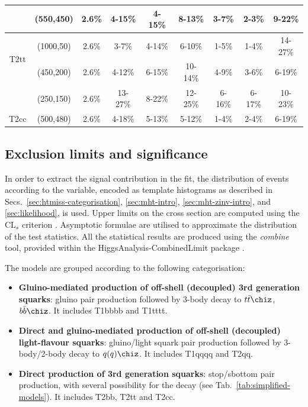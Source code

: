 \begin{table}[h!]
\begin{tabular}{ ccccccccc }
            & (550,450)  & 2.6\% & 4-15\% & 4-15\% & 8-13\% & 3-7\% & 2-3\% & 9-22\%  \\ 
        \hline
        \multirow{2}{*}{T2tt}
            & (1000,50) & 2.6\% & 3-7\%   & 4-14\% & 6-10\%  & 1-5\%  & 1-4\%  & 14-27\% \\
            & (450,200) & 2.6\% & 4-12\%  & 6-15\% & 10-14\% & 4-9\%  & 3-6\%  & 6-19\%  \\
            & (250,150) & 2.6\% & 13-27\% & 8-22\% & 12-25\% & 6-16\% & 6-17\% & 10-23\% \\
        \hline
        \multirow{1}{*}{T2cc}
            & (500,480) & 2.6\% & 4-18\% & 5-13\% & 5-12\% & 1-4\% & 2-4\% & 6-19\% \\
        \hline \hline
    \end{tabular}
\end{table}

\clearpage
\subsection{Exclusion limits and significance}
\label{sec:DM_results}

In order to extract the signal contribution in the fit, the
distribution of events according to the \mht variable, encoded as
template histograms as described in
Secs.~\ref{sec:htmiss-categorisation}, \ref{sec:mht-intro},
\ref{sec:mht-zinv-intro}, and \ref{sec:likelihood}, is used. Upper
limits on the cross section are computed using the $\text{CL}_{s}$
criterion \cite{CLsTechnique}. Asymptotic formulae
\cite{AsymptoticFormulae} are utilised to approximate the distribution
of the test statistics. All the statistical results are produced using
the \textit{combine} tool, provided within the
HiggsAnalysis-CombinedLimit package \cite{Combine}.

The models are grouped according to the following categorisation:
\begin{itemize}
\item \textbf{Gluino-mediated production of off-shell (decoupled) 3rd
    generation squarks}: gluino pair production followed by 3-body
  decay to $t\bar{t}\chiz$,$b\bar{b}\chiz$.  It includes T1bbbb and
  T1tttt.
\item \textbf{Direct and gluino-mediated production of off-shell
    (decoupled) light-flavour squarks}: gluino/light squark pair
  production followed by 3-body/2-body decay to $q(q)\chiz$. It
  includes T1qqqq and T2qq.
\item \textbf{Direct production of 3rd generation squarks}:
  stop/sbottom pair production, with several possibility for the decay
  (see Tab.~\ref{tab:simplified-models}). It includes T2bb, T2tt and
  T2cc.
\end{itemize}

